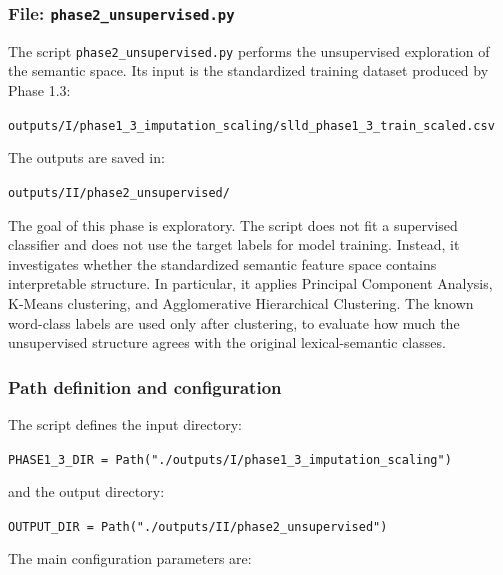 \documentclass{ipgpmaster}
\begin{document}
\subsubsection{File: \texttt{phase2\_unsupervised.py}}

The script \texttt{phase2\_unsupervised.py} performs the unsupervised exploration of the semantic space. Its input is the standardized training dataset produced by Phase 1.3:

\begin{center}
\texttt{outputs/I/phase1\_3\_imputation\_scaling/slld\_phase1\_3\_train\_scaled.csv}
\end{center}

The outputs are saved in:

\begin{center}
\texttt{outputs/II/phase2\_unsupervised/}
\end{center}

The goal of this phase is exploratory. The script does not fit a supervised classifier and does not use the target labels for model training. Instead, it investigates whether the standardized semantic feature space contains interpretable structure. In particular, it applies Principal Component Analysis, K-Means clustering, and Agglomerative Hierarchical Clustering. The known word-class labels are used only after clustering, to evaluate how much the unsupervised structure agrees with the original lexical-semantic classes.

\subsubsection{Path definition and configuration}

The script defines the input directory:

\begin{center}
\texttt{PHASE1\_3\_DIR = Path("./outputs/I/phase1\_3\_imputation\_scaling")}
\end{center}

and the output directory:

\begin{center}
\texttt{OUTPUT\_DIR = Path("./outputs/II/phase2\_unsupervised")}
\end{center}

The main configuration parameters are:
\end{document}
